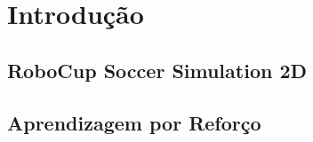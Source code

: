 
\chapter{Introdução}

\label{CapIntro}



\section{RoboCup Soccer Simulation 2D}

\section{Aprendizagem por Reforço}
